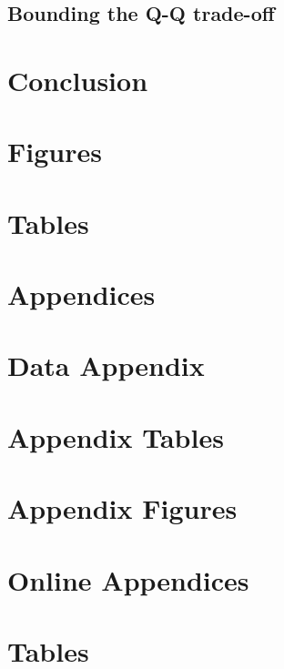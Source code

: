 \documentclass[subeqn]{article}
\begin{document}
\begin{spacing}{1.4}
\subsection{Bounding the Q-Q trade-off}            \label{TWINsscn:resultBounds}



\section{Conclusion}                               \label{TWINscn:conclusion}

\newpage
\section*{Figures}


\clearpage
\section*{Tables}

\clearpage




\newpage
\appendix
\section*{Appendices}
\section{Data Appendix}
\newpage
\end{spacing}

\section{Appendix Tables}

\newpage

\section{Appendix Figures}


\newpage
\appendix
\section*{Online Appendices}
\section{Tables}

\end{document}
